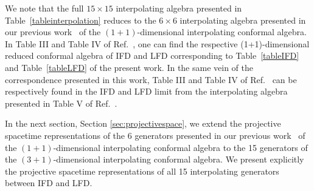 \documentclass[foundations,article,submit,pdftex,moreauthors]{Definitions/mdpi}
\begin{document}
We note that the full $15 \times 15$ interpolating algebra presented in Table~\ref{tableinterpolation} reduces to the 
$6 \times 6$ interpolating algebra presented in our previous work~\cite{Ji-Hari-2026-PRD} of the $(1+1)$-dimensional interpolating conformal algebra. In Table III and Table IV of Ref.~\cite{Ji-Hari-2026-PRD}, one can find the respective (1+1)-dimensional reduced conformal algebra of IFD and LFD corresponding to Table~\ref{tableIFD}
and Table~\ref{tableLFD} of the present work.
In the same vein of the correspondence presented in this work, Table III and Table IV of Ref.~\cite{Ji-Hari-2026-PRD} can be respectively found in the IFD and LFD limit 
from the interpolating algebra presented in 
Table V of Ref.~\cite{Ji-Hari-2026-PRD}. 

In the next section, Section \ref{sec:projectivespace}, we extend the projective spacetime representations of the 6 generators presented in our previous 
work~\cite{Ji-Hari-2026-PRD} of the $(1+1)$-dimensional interpolating conformal
algebra to the 15 generators of the $(3+1)$-dimensional interpolating conformal
algebra. We present explicitly the projective spacetime representations of all 15 interpolating generators between IFD and LFD.
\end{document}
